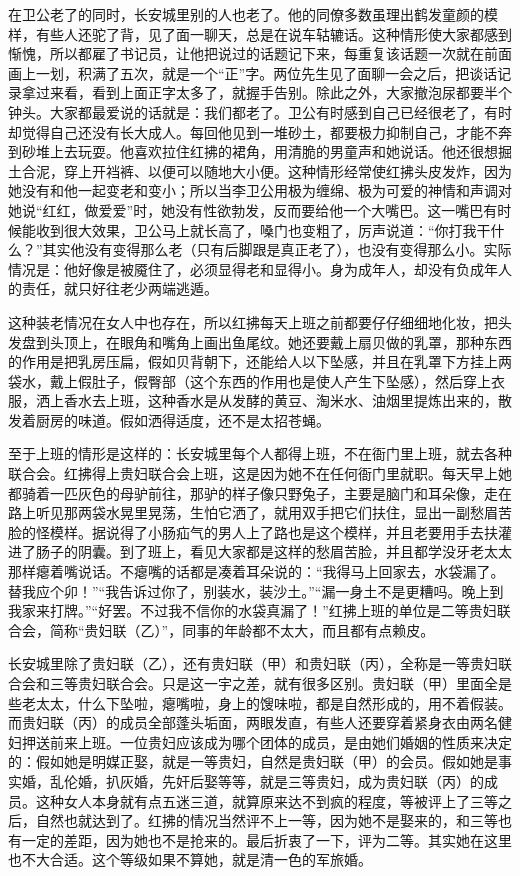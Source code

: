 在卫公老了的同时，长安城里别的人也老了。他的同僚多数虽理出鹤发童颜的模样，有些人还驼了背，见了面一聊天，总是在说车轱辘话。这种情形使大家都感到惭愧，所以都雇了书记员，让他把说过的话题记下来，每重复该话题一次就在前面画上一划，积满了五次，就是一个“正”字。两位先生见了面聊一会之后，把谈话记录拿过来看，看到上面正字太多了，就握手告别。除此之外，大家撤泡尿都要半个钟头。大家都最爱说的话就是：我们都老了。卫公有时感到自己已经很老了，有时却觉得自己还没有长大成人。每回他见到一堆砂土，都要极力抑制自己，才能不奔到砂堆上去玩耍。他喜欢拉住红拂的裙角，用清脆的男童声和她说话。他还很想掘土合泥，穿上开裆裤、以便可以随地大小便。这种情形经常使红拂头皮发炸，因为她没有和他一起变老和变小；所以当李卫公用极为缠绵、极为可爱的神情和声调对她说“红红，做爱爱”时，她没有性欲勃发，反而要给他一个大嘴巴。这一嘴巴有时候能收到很大效果，卫公马上就长高了，嗓门也变粗了，厉声说道：“你打我干什么？”其实他没有变得那么老（只有后脚跟是真正老了），也没有变得那么小。实际情况是：他好像是被魇住了，必须显得老和显得小。身为成年人，却没有负成年人的责任，就只好往老少两端逃遁。 

这种装老情况在女人中也存在，所以红拂每天上班之前都要仔仔细细地化妆，把头发盘到头顶上，在眼角和嘴角上画出鱼尾纹。她还要戴上扇贝做的乳罩，那种东西的作用是把乳房压扁，假如贝背朝下，还能给人以下坠感，并且在乳罩下方挂上两袋水，戴上假肚子，假臀部（这个东西的作用也是使人产生下坠感），然后穿上衣服，洒上香水去上班，这种香水是从发酵的黄豆、淘米水、油烟里提炼出来的，散发着厨房的味道。假如洒得适度，还不是太招苍蝇。 

至于上班的情形是这样的：长安城里每个人都得上班，不在衙门里上班，就去各种联合会。红拂得上贵妇联合会上班，这是因为她不在任何衙门里就职。每天早上她都骑着一匹灰色的母驴前往，那驴的样子像只野兔子，主要是脑门和耳朵像，走在路上听见那两袋水晃里晃荡，生怕它洒了，就用双手把它们扶住，显出一副愁眉苦脸的怪模样。据说得了小肠疝气的男人上了路也是这个模样，并且老要用手去扶灌进了肠子的阴囊。到了班上，看见大家都是这样的愁眉苦脸，并且都学没牙老太太那样瘪着嘴说话。不瘪嘴的话都是凑着耳朵说的：“我得马上回家去，水袋漏了。替我应个卯！”“我告诉过你了，别装水，装沙土。”“漏一身土不是更糟吗。晚上到我家来打牌。”“好罢。不过我不信你的水袋真漏了！”红拂上班的单位是二等贵妇联合会，简称“贵妇联（乙）”，同事的年龄都不太大，而且都有点赖皮。 

长安城里除了贵妇联（乙），还有贵妇联（甲）和贵妇联（丙），全称是一等贵妇联合会和三等贵妇联合会。只是这一宇之差，就有很多区别。贵妇联（甲）里面全是些老太太，什么下坠啦，瘪嘴啦，身上的馊味啦，都是自然形成的，用不着假装。而贵妇联（丙）的成员全部蓬头垢面，两眼发直，有些人还要穿着紧身衣由两名健妇押送前来上班。一位贵妇应该成为哪个团体的成员，是由她们婚姻的性质来决定的：假如她是明媒正娶，就是一等贵妇，自然是贵妇联（甲）的会员。假如她是事实婚，乱伦婚，扒灰婚，先奸后娶等等，就是三等贵妇，成为贵妇联（丙）的成员。这种女人本身就有点五迷三道，就算原来达不到疯的程度，等被评上了三等之后，自然也就达到了。红拂的情况当然评不上一等，因为她不是娶来的，和三等也有一定的差距，因为她也不是抢来的。最后折衷了一下，评为二等。其实她在这里也不大合适。这个等级如果不算她，就是清一色的军旅婚。 

